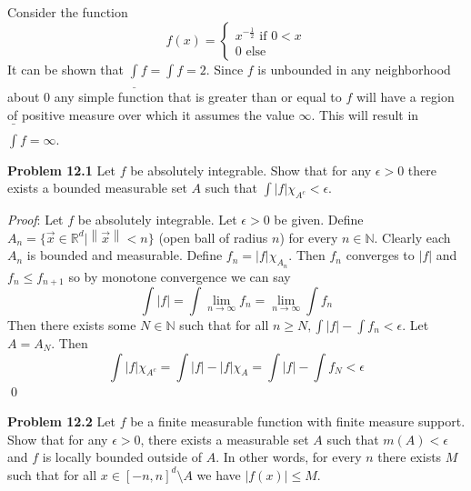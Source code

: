 \documentclass[12pt]{article}
\newcommand{\problem}[1]{\hspace{-4 ex} \large \textbf{Problem #1} }
\newcommand{\norm}[1]{\left\lVert#1\right\rVert}
\renewenvironment{proof}{\hspace{-4 ex} \emph{Proof}:}{\qed}
\begin{document}
	Consider the function 
	\[
	f(x) = \begin{cases}
		x^{-\frac{1}{2}} \text{ if } 0<x\\
		0 \text{ else}
	\end{cases}
	\]
	It can be shown that $ \underline{\int}f = \int f = 2$. Since $f$ is unbounded in any neighborhood about $0$ any simple function that is greater than or equal to $f$ will have a region of positive measure over which it assumes the value $\infty$. This will result in $\bar{\int}f = \infty$.
	

\problem{12.1} Let $f$ be absolutely integrable. Show that for any $\epsilon>0$ there exists a bounded measurable set $A$ such that $\int |f|\chi_{A^c}<\epsilon$.

	\begin{proof}
		Let $f$ be absolutely integrable. Let $\epsilon > 0 $ be given. Define $A_n = \{ \vec{x} \in \mathbb{R}^d \vert \norm{\vec{x}} < n \}$ (open ball of radius $n$) for every $n \in \mathbb{N}$. Clearly each $A_n$ is bounded and measurable. Define $f_n = \vert f \vert \chi_{A_n}$. Then $f_n$ converges to $\vert f \vert$ and $f_n \leq f_{n+1}$ so by monotone convergence we can say 
		$$
		\int \vert f \vert = \int \lim_{n \to \infty}{f_n} = \lim_{n \to \infty} \int f_n
		$$
		Then there exists some $N \in \mathbb{N}$ such that for all $n \geq N, \int \vert f \vert - \int f_n < \epsilon$. Let $A = A_N$. Then 
		$$
		\int |f|\chi_{A^c} = \int \vert f \vert - |f|\chi_{A} = \int \vert f \vert - \int f_N < \epsilon 
		$$
	\end{proof}

\problem{12.2} Let $f$ be a finite measurable function with finite measure support. Show that for any $\epsilon>0$, there exists a measurable set $A$ such that $m(A)<\epsilon$ and $f$ is locally bounded outside of $A$. In other words, for every $n$ there exists $M$ such that for all $x\in[-n,n]^d\setminus A$ we have $ \vert f(x) \vert \leq M$.\bigbreak
\end{document}
